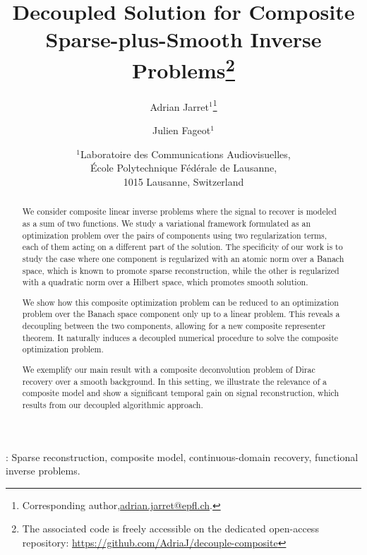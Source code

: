 \documentclass[12pt]{article}
\title{Decoupled Solution for Composite Sparse-plus-Smooth Inverse Problems\footnote{The associated code is freely accessible on the dedicated open-access repository: \url{https://github.com/AdriaJ/decouple-composite}}}
\author{Adrian Jarret$^1$\thanks{ Corresponding author,\url{adrian.jarret@epfl.ch}.} \and Julien Fageot$^1$}
\date{
	$^1${\small Laboratoire des Communications Audiovisuelles,\\ \'Ecole Polytechnique Fédérale de Lausanne,\\ 1015 Lausanne, Switzerland}%
}
\begin{document}
\maketitle

\begin{abstract}
    We consider composite linear inverse problems where the signal to recover is modeled as a sum of two functions. 
    We study a variational framework formulated as an optimization problem over the pairs of components using two regularization terms, each of them acting on a different part of the solution.
    The specificity of our work is to study the case where one component is regularized with an atomic norm over a Banach space, which is known to promote sparse reconstruction, while the other is regularized with a quadratic norm over a Hilbert space, which promotes smooth solution.

    We show how this composite optimization problem can be reduced to an optimization problem over the Banach space component only up to a linear problem.
    This reveals a decoupling between the two components, allowing for a new composite representer theorem.
    It naturally induces a decoupled numerical procedure to solve the composite optimization problem.

    We exemplify our main result with a composite deconvolution problem of Dirac recovery over a smooth background. In this setting, we illustrate the relevance of a composite model and show a significant temporal gain on signal reconstruction, which results from our decoupled algorithmic approach.

\end{abstract}

: Sparse reconstruction, composite model, continuous-domain recovery, functional inverse problems. 
\end{document}
